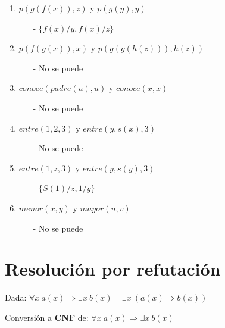\documentclass[12pt]{article} %
\begin{document}
\begin{enumerate}
\item $p(g(f(x)), z)$ y $p(g(y), y)$
	\begin{itemize}
	\item[-] $\{ f(x)/y, f(x)/z  \}$
	\end{itemize}

\item $p(f(g(x)), x)$ y $p(g(g(h(z))), h(z))$
	\begin{itemize}
	\item[-]  No se puede
	\end{itemize}

\item $conoce(padre(u), u)$ y $conoce(x, x)$
	\begin{itemize}
	\item[-] No se puede
	\end{itemize}

\item $entre(1, 2, 3)$ y $entre(y, s(x), 3)$
	\begin{itemize}
	\item[-] No se puede
	\end{itemize}

\item $entre(1, z, 3)$ y $entre (y, s(y), 3)$
	\begin{itemize}
	\item[-] $\{  S(1)/z, 1/y \}$
	\end{itemize}

\item $menor(x, y)$ y $mayor(u, v)$
	\begin{itemize}
	\item[-] No se puede
	\end{itemize}


\end{enumerate}

\section{Resolución por refutación}

\par Dada: $\forall x\  a(x) \Rightarrow \exists x \  b(x) \vdash \exists x \  (a(x) \Rightarrow b(x))$\\

\par Conversión a \textbf{CNF} de: $\forall x\ a(x) \Rightarrow \exists x \ b(x)$
\end{document}

